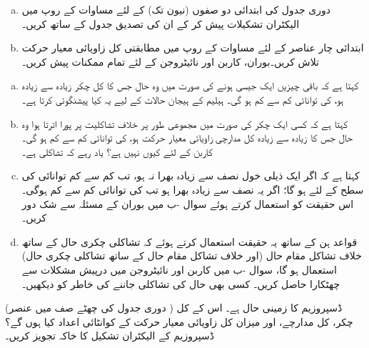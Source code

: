 \begin{enumerate}[a.]
\item
 دوری جدول کی ابتدائی دو صفوں (نیون تک) کے لئے مساوات  کے روپ میں الیکٹران تشکیلات پیش کر کے ان کی تصدیق جدول  کے ساتھ کریں۔ 
 \item
 ابتدائی چار عناصر کے لئے مساوات  کے روپ میں مطابقتی کل زاویائی معیار حرکت تلاش کریں۔بوران، کاربن اور نائیٹروجن کے لئے تمام ممکنات پیش کریں۔
 \end{enumerate}
\begin{enumerate}[a.]
\item
{} کہتا ہے کہ باقی چیزیں ایک جیسی ہونے کی صورت میں وہ حال جس کا کل چکر  زیادہ سے زیادہ ہو، کی توانائی کم سے کم ہو گی۔ ہیلیم کے ہیجان حالات کے لیے یہ کیا پیشنگوئی کرتا ہے۔
 \item
{} کہتا ہے کہ کسی ایک چکر کی صورت میں مجموعی طور پر خلاف تشاکلیت پر پورا اترتا ہوا وہ حال جس کا زیادہ سے زیادہ کل مدارچی زاویائی معیار حرکت  ہو، کی توانائی کم سے کم ہو گی۔ کاربن کے لئے  کیوں نہیں ہے؟ یاد رہے کہ   تشاکلی ہے۔
\item
{} کہتا ہے کہ اگر ایک ذیلی خول  نصف سے زیادہ بھرا نہ ہو، تب کم سے کم توانائی کی سطح کے لئے  ہو گا؛ اگر یہ نصف سے زیادہ بھرا ہو تب  کی توانائی کم سے کم ہوگی۔ اس حقیقت کو استعمال کرتے ہوئے سوال -ب میں بوران کے مسئلہ سے شک دور کریں۔
\item
 قواعد ہن کے ساتھ یہ حقیقت استعمال کرتے ہوئے کہ تشاکلی چکری حال کے ساتھ خلاف تشاکل مقام حال (اور خلاف تشاکل مقام حال کے ساتھ تشاکلی چکری حال) استعمال ہو گا، سوال -ب میں کاربن اور نائیٹروجن میں درپیش مشکلات سے چھٹکارا حاصل کریں۔ کسی بھی حال کی تشاکلی جاننے کی خاطر  کو دیکھیں۔
\end{enumerate}
 (دوری جدول کی چھٹے صف میں عنصر ) ڈسپروزیم کا زمینی حال  ہے۔ اس کے کل چکر، کل مدارچے، اور میزان کل زاویائی معیار حرکت کے کوانٹائی اعداد کیا ہوں گے؟ ڈسپروزیم کے الیکٹران تشکیل کا خاکہ تجویز کریں۔
 
